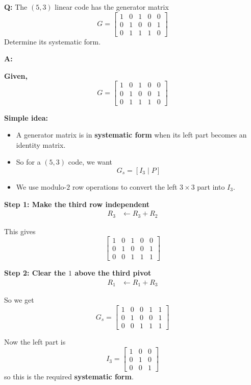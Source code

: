 \documentclass[11pt,a4paper]{book}
\newcounter{qna}[chapter]
\renewcommand{\theqna}{\thechapter.\arabic{qna}}
\newenvironment{questionanswerbox}[1][Example]{%
    \refstepcounter{qna}
    \begin{tcolorbox}[
        enhanced,
        breakable,
        colback=softlavender!10,
        colframe=softlavender!200,
        title={#1~\theqna},
        fonttitle=\bfseries,
        coltitle=white,
        colbacktitle=softlavender!200,
        sharp corners,
        boxrule=1pt,
        left=8pt,
        right=8pt,
        top=6pt,
        bottom=6pt
    ]
}{\end{tcolorbox}}
\begin{document}
\begin{questionanswerbox}[Systematic Form of a Generator Matrix Example]
\textbf{Q:} The \((5,3)\) linear code has the generator matrix
\[
G=
\begin{bmatrix}
1&0&1&0&0\\
0&1&0&0&1\\
0&1&1&1&0
\end{bmatrix}
\]
Determine its systematic form.

\textbf{A:}

\textbf{Given,}
\[
G=
\begin{bmatrix}
1&0&1&0&0\\
0&1&0&0&1\\
0&1&1&1&0
\end{bmatrix}
\]

\textbf{Simple idea:}
\begin{itemize}
    \item A generator matrix is in \textbf{systematic form} when its left part becomes an identity matrix.
    \item So for a \((5,3)\) code, we want
    \[
    G_s=[I_3\mid P]
    \]
    \item We use modulo-\(2\) row operations to convert the left \(3\times 3\) part into \(I_3\).
\end{itemize}

\textbf{Step 1: Make the third row independent}
\begin{align*}
R_3 &\leftarrow R_3+R_2
\end{align*}

This gives
\[
\begin{bmatrix}
1&0&1&0&0\\
0&1&0&0&1\\
0&0&1&1&1
\end{bmatrix}
\]

\textbf{Step 2: Clear the \(1\) above the third pivot}
\begin{align*}
R_1 &\leftarrow R_1+R_3
\end{align*}

So we get
\[
G_s=
\begin{bmatrix}
1&0&0&1&1\\
0&1&0&0&1\\
0&0&1&1&1
\end{bmatrix}
\]

Now the left part is
\[
I_3=
\begin{bmatrix}
1&0&0\\
0&1&0\\
0&0&1
\end{bmatrix}
\]
so this is the required \textbf{systematic form}.
\end{questionanswerbox}
\end{document}
